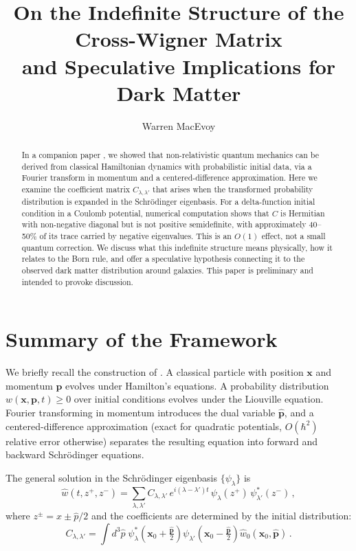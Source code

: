 \documentclass[12pt]{article}
\title{On the Indefinite Structure of the Cross-Wigner Matrix\\and Speculative Implications for Dark Matter}
\author{Warren MacEvoy}
\begin{document}
\maketitle

\begin{abstract}
In a companion paper \cite{macevoy2025}, we showed that non-relativistic quantum mechanics can be derived from classical Hamiltonian dynamics with probabilistic initial data, via a Fourier transform in momentum and a centered-difference approximation.  Here we examine the coefficient matrix $C_{\lambda,\lambda'}$ that arises when the transformed probability distribution is expanded in the Schr\"odinger eigenbasis.  For a delta-function initial condition in a Coulomb potential, numerical computation shows that $C$ is Hermitian with non-negative diagonal but is not positive semidefinite, with approximately 40--50\% of its trace carried by negative eigenvalues.  This is an $O(1)$ effect, not a small quantum correction.  We discuss what this indefinite structure means physically, how it relates to the Born rule, and offer a speculative hypothesis connecting it to the observed dark matter distribution around galaxies.  This paper is preliminary and intended to provoke discussion.
\end{abstract}

\section{Summary of the Framework}

We briefly recall the construction of \cite{macevoy2025}.  A classical particle with position $\mathbf{x}$ and momentum $\mathbf{p}$ evolves under Hamilton's equations.  A probability distribution $w(\mathbf{x},\mathbf{p},t) \geq 0$ over initial conditions evolves under the Liouville equation.  Fourier transforming in momentum introduces the dual variable $\hat{\mathbf{p}}$, and a centered-difference approximation (exact for quadratic potentials, $O(\hbar^2)$ relative error otherwise) separates the resulting equation into forward and backward Schr\"odinger equations.

The general solution in the Schr\"odinger eigenbasis $\{\psi_\lambda\}$ is
\begin{equation}\label{eq:w-hat-expansion}
\hat{w}(t,z^+,z^-) = \sum_{\lambda,\lambda'} C_{\lambda,\lambda'}\, e^{i(\lambda-\lambda')t}\, \psi_\lambda(z^+)\, \psi^*_{\lambda'}(z^-) \,,
\end{equation}
where $z^\pm = x \pm \hat{p}/2$ and the coefficients are determined by the initial distribution:
\begin{equation}\label{eq:C-coefficients}
C_{\lambda,\lambda'} = \int d^3\hat{p}\; \psi_\lambda^*\!\left(\mathbf{x}_0+\tfrac{\hat{\mathbf{p}}}{2}\right) \psi_{\lambda'}\!\left(\mathbf{x}_0-\tfrac{\hat{\mathbf{p}}}{2}\right) \hat{w}_0(\mathbf{x}_0, \hat{\mathbf{p}}) \,.
\end{equation}
\end{document}
